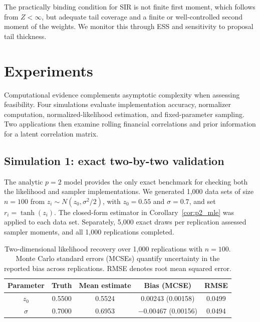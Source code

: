 \documentclass[
  12pt]{article}
\begin{document}
The practically binding condition for SIR is not finite first moment, which follows from $Z<\infty$, but adequate tail coverage and a finite or well-controlled second moment of the weights. We monitor this through ESS and sensitivity to proposal tail thickness.


\section{Experiments}\label{sec:experiments}

Computational evidence complements asymptotic complexity when assessing feasibility. Four simulations evaluate implementation accuracy, normalizer computation, normalized-likelihood estimation, and fixed-parameter sampling. Two applications then examine rolling financial correlations and prior information for a latent correlation matrix.


\subsection{Simulation 1: exact two-by-two validation}\label{sec:sim1}

The analytic $p=2$ model provides the only exact benchmark for checking both the likelihood and sampler implementations. We generated 1,000 data sets of size $n=100$ from $z_i\sim N(z_0,\sigma^2/2)$, with $z_0=0.55$ and $\sigma=0.7$, and set $r_i=\tanh(z_i)$. The closed-form estimator in Corollary~\ref{cor:p2_mle} was applied to each data set. Separately, 5,000 exact draws per replication assessed sampler moments, and all 1,000 replications completed.

\begin{table}[H]
\centering
\caption{Two-dimensional likelihood recovery over 1,000 replications with $n=100$. Monte Carlo standard errors (MCSEs) quantify uncertainty in the reported bias across replications. RMSE denotes root mean squared error.}
\label{tab:sim1_recovery}
\begin{tabular}{ccccc}
\toprule
Parameter & Truth & Mean estimate & Bias (MCSE) & RMSE \\
\midrule
$z_0$ & 0.5500 & 0.5524 & \phantom{$-$}0.00243 (0.00158) & 0.0499 \\
$\sigma$ & 0.7000 & 0.6953 & $-0.00467$ (0.00156) & 0.0494 \\
\bottomrule
\end{tabular}
\end{table}
\end{document}
